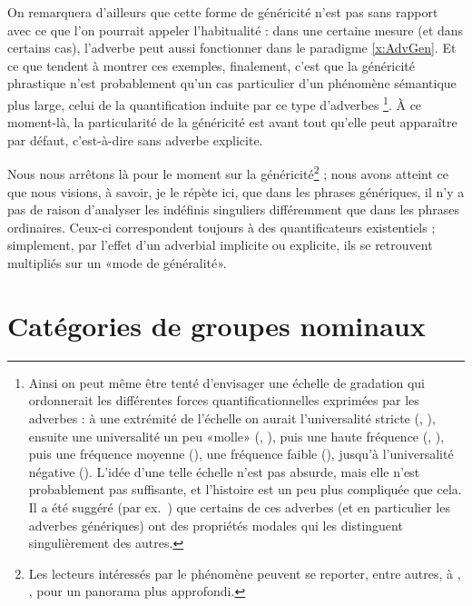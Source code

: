 On remarquera d'ailleurs que cette forme de généricité n'est pas sans
rapport avec ce que l'on pourrait appeler l'habitualité : dans une
certaine mesure (et dans certains cas), l'adverbe
 peut aussi fonctionner dans le paradigme
\ref{x:AdvGen}. 
Et ce que tendent à montrer ces exemples, finalement, c'est que la
généricité phrastique n'est probablement qu'un cas particulier d'un
phénomène sémantique plus large, celui de la quantification induite
par ce type d'adverbes%
\footnote{Ainsi on peut même être tenté d'envisager une échelle de
  gradation qui ordonnerait les différentes forces
  quantificationnelles exprimées par les adverbes : à une extrémité de
  l'échelle on aurait l'universalité stricte (,
  ), ensuite une universalité un peu «molle» (, ), puis une haute
  fréquence (, ), puis une
    fréquence moyenne (), une fréquence faible
    (), jusqu'à  l'universalité négative
    ().  L'idée d'une telle échelle n'est pas absurde,
    mais elle n'est probablement pas suffisante, et l'histoire est un
    peu plus compliquée que cela. Il a été suggéré (par ex.\ \citealt{Generic:Intro})\nocite{Generic} que certains de ces
    adverbes (et en particulier les adverbes génériques) ont des
    propriétés modales qui les distinguent singulièrement des autres.}.
À ce moment-là, la particularité de la généricité est avant tout qu'elle 
peut apparaître par défaut, c'est-à-dire sans adverbe explicite.


Nous nous arrêtons là pour le moment sur la généricité\footnote{Les lecteurs intéressés par le phénomène peuvent se reporter, entre autres, à \citet{Generic:Intro}, \citet{Cohen:02}, \citet{Sorin:06g} pour un panorama plus approfondi.} ; 
nous avons atteint ce que nous visions, à savoir, je le répète ici, que dans les phrases génériques, il n'y a pas de raison d'analyser les {\GN} indéfinis singuliers différemment que dans les phrases ordinaires.
Ceux-ci correspondent toujours à des quantificateurs existentiels ; simplement, par l'effet d'un adverbial implicite ou explicite, ils se retrouvent multipliés sur un «mode de généralité».




\section{Catégories de groupes nominaux}
\label{s:CatGN}

